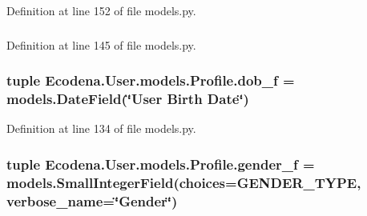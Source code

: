 Definition at line 152 of file models.py.

\hypertarget{class_ecodena_1_1_user_1_1models_1_1_profile_aa1c680ce4e197bcf65844505c0ab5784}{
\subsubsection[{dob\_\-f}]{}}
\label{d2/de8/class_ecodena_1_1_user_1_1models_1_1_profile_aa1c680ce4e197bcf65844505c0ab5784}


Definition at line 145 of file models.py.

\hypertarget{class_ecodena_1_1_user_1_1models_1_1_profile_aa21eaecc5ddfe2d63af834e8872bbae5}{
\subsubsection[{dob\_\-f}]{\setlength{\rightskip}{0pt plus 5cm}tuple {\bf Ecodena.User.models.Profile.dob\_\-f} = models.DateField(\char`\"{}User Birth Date\char`\"{})}}
\label{d2/de8/class_ecodena_1_1_user_1_1models_1_1_profile_aa21eaecc5ddfe2d63af834e8872bbae5}


Definition at line 134 of file models.py.

\hypertarget{class_ecodena_1_1_user_1_1models_1_1_profile_ab5e59193a1b014e2f6ce017850bbc429}{
\subsubsection[{gender\_\-f}]{\setlength{\rightskip}{0pt plus 5cm}tuple {\bf Ecodena.User.models.Profile.gender\_\-f} = models.SmallIntegerField(choices={\bf GENDER\_\-TYPE}, verbose\_\-name=\char`\"{}Gender\char`\"{})}}
\label{d2/de8/class_ecodena_1_1_user_1_1models_1_1_profile_ab5e59193a1b014e2f6ce017850bbc429}


